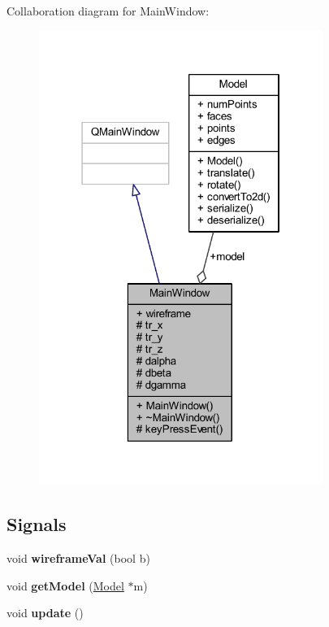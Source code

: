 Collaboration diagram for Main\+Window\+:
\nopagebreak
\begin{figure}[H]
\begin{center}
\leavevmode
\includegraphics[width=262pt]{class_main_window__coll__graph}
\end{center}
\end{figure}
\subsection*{Signals}
\begin{DoxyCompactItemize}
\item 
\mbox{\label{class_main_window_a482b2d965f153134f11f834fcd28fed5}} 
void {\bfseries wireframe\+Val} (bool b)
\item 
\mbox{\label{class_main_window_a9bd4c07ced537631f1e93c8b5888e78d}} 
void {\bfseries get\+Model} (\mbox{\hyperlink{class_model}{Model}} $\ast$m)
\item 
\mbox{\label{class_main_window_a128f71880d4b9683149023fc46fcc9f8}} 
void {\bfseries update} ()
\end{DoxyCompactItemize}
